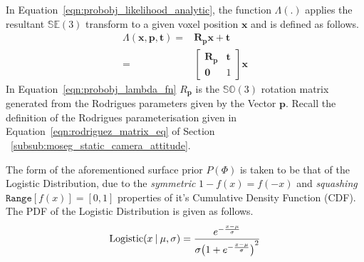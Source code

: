 In Equation~\ref{eqn:probobj_likelihood_analytic}, the function \(\Lambda(.)\)
applies the resultant \(\mathbb{SE}(3)\) transform to a given voxel position
\(\bm{x}\) and is defined as follows.
\begin{align}
  \label{eqn:probobj_lambda_fn}
  \Lambda(\bm{x}, \bm{p}, \bm{t}) ={}&
  \bm{R}_{\bm{p}} \bm{x} + \bm{t}\\
  ={}& 
  \begin{bmatrix}
    \bm{R}_{\bm{p}} & \bm{t} \\
    \bm{0} & 1
  \end{bmatrix}
  \bm{x}
\end{align}
In Equation~\ref{eqn:probobj_lambda_fn} \(R_{\bm{p}}\) is the \(\mathbb{SO}(3)\)
rotation matrix generated from the Rodrigues parameters given by the Vector
\(\bm{p}\). Recall the definition of the Rodrigues parameterisation given in
Equation~\ref{eqn:rodriguez_matrix_eq} of Section
~\ref{subsub:moseg_static_camera_attitude}.

The form of the aforementioned surface prior \(P(\Phi)\) is taken to be that of
the Logistic Distribution, due to the \textit{symmetric} \(1 - f(x) = f(-x)\)
and \textit{squashing} \(\texttt{Range}[f(x)] = [0, 1]\) properties of it's Cumulative
Density Function (CDF). The PDF of the Logistic Distribution is given as follows.
\begin{equation}
  \label{eqn:probobj_logistic_dist}
  \text{Logistic}(x \:\vert\: \mu, \sigma) = \frac
  {e^{-\frac{x - \mu}{\sigma}}}
  {\sigma {\big( 1 + e^{-\frac{x - \mu}{\sigma}} \big)}^{2}}
\end{equation}

